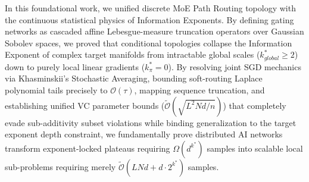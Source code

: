 \documentclass{article}
\newcommand{\1}{\mathbb{I}}
\newcommand{\calO}{\mathcal{O}}
\begin{document}
In this foundational work, we unified discrete MoE Path Routing topology with the continuous statistical physics of Information Exponents. By defining gating networks as cascaded affine Lebesgue-measure truncation operators over Gaussian Sobolev spaces, we proved that conditional topologies collapse the Information Exponent of complex target manifolds from intractable global scales ($k_{global}^* \ge 2$) down to purely local linear gradients ($k_\pi^* = 0$). By resolving joint SGD mechanics via Khasminskii's Stochastic Averaging, bounding soft-routing Laplace polynomial tails precisely to $\calO(\tau)$, mapping sequence truncation, and establishing unified VC parameter bounds ($\tilde{\calO}(\sqrt{L^2 Nd/n})$) that completely evade sub-additivity subset violations while binding generalization to the target exponent depth constraint, we fundamentally prove distributed AI networks transform exponent-locked plateaus requiring $\Omega(d^{k^*})$ samples into scalable local sub-problems requiring merely $\tilde{\calO}(LNd + d \cdot 2^{k^*})$ samples.






\newpage
{
\small


}













% 

%



\end{document}
